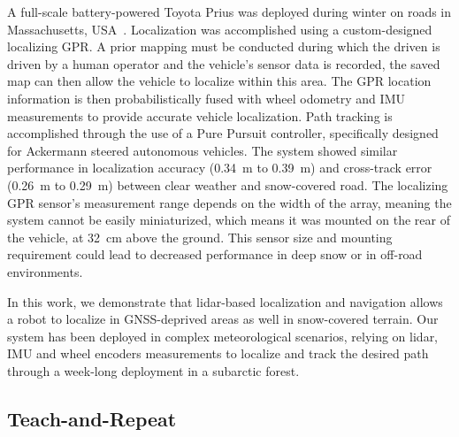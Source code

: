 A full-scale battery-powered Toyota Prius was deployed during winter on roads in Massachusetts, USA~\citep{Ort2020}.
Localization was accomplished using a custom-designed localizing \ac{GPR}. 
A prior mapping must be conducted during which the driven is driven by a human operator and the vehicle's sensor data is recorded, the saved map can then allow the vehicle to localize within this area.
The \ac{GPR} location information is then probabilistically fused with wheel odometry and \ac{IMU} measurements to provide accurate vehicle localization.
Path tracking is accomplished through the use of a Pure Pursuit controller, specifically designed for Ackermann steered autonomous vehicles.
The system showed similar performance in localization accuracy (\SI{0.34}{m} to \SI{0.39}{m}) and cross-track error (\SI{0.26}{m} to \SI{0.29}{m}) between clear weather and snow-covered road.
The localizing \ac{GPR} sensor's measurement range depends on the width of the array, meaning the system cannot be easily miniaturized, which means it was mounted on the rear of the vehicle, at \SI{32}{cm} above the ground.
This sensor size and mounting requirement could lead to decreased performance in deep snow or in off-road environments. 

In this work, we demonstrate that lidar-based localization and navigation allows a robot to localize in \ac{GNSS}-deprived areas as well in snow-covered terrain.
Our system has been deployed in complex meteorological scenarios, relying on lidar, \ac{IMU} and wheel encoders measurements to localize and track the desired path through a week-long deployment in a subarctic forest. 


\subsection{Teach-and-Repeat}
\label{rel_nav}

